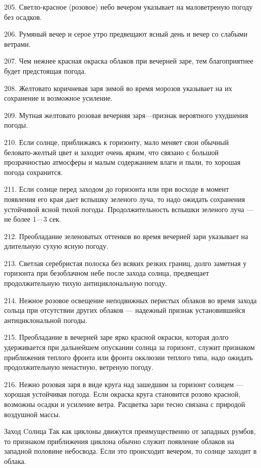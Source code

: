 205. Светло-красное (розовое) небо вечером указывает на маловетреную погоду без осадков.

206. Румяный вечер и серое утро предвещают ясный день и вечер со слабыми ветрами.

207. Чем нежнее красная окраска облаков при вечерней заре, тем благоприятнее будет предстоящая погода.

208. Желтовато коричневая заря зимой во время морозов указывает на их сохранение и возможное усиление.

209. Мутная желтовато розовая вечерняя заря—признак вероятного ухудшения погоды.

210. Если солнце, приближаясь к горизонту, мало меняет свои обычный беловато-желтый цвет и заходит очень ярким, что связано с большой прозрачностью атмосферы и малым содержанием влаги и пыли, то хорошая погода сохранится.

211. Если солнце перед заходом до горизонта или при восходе в момент появления его края дает вспышку зеленого луча, то надо ожидать сохранения устойчивой ясной тихой погоды. Продолжительность вспышки зеленого луча — не более 1—3 сек.

212. Преобладание зеленоватых оттенков во время вечерней зари указывает на длительную сухую ясную погоду.

213. Светлая серебристая полоска без всяких резких границ, долго заметная у горизонта при безоблачном небе после захода солнца, предвещает продолжительную тихую антициклональную погоду.

214. Нежное розовое освещение неподвижных перистых облаков во время захода сольца при отсутствии других облаков — надежный признак установившейся антициклональной погоды.

215. Преобладание в вечерней заре ярко красной окраски, которая долго удерживается при дальнейшем опускании солнца за горизонт, служит признаком приближения теплого фронта или фронта окклюзии теплого типа, надо ожидать продолжительную ненастную, ветреную погоду.

216. Нежно розовая заря в виде круга над зашедшим за горизонт солнцем — хорошая устойчивая погода. Если окраска круга становится розово красной, возможны осадки и усиление ветра. Расцветка зари тесно связана с природой воздушной массы.

Заход Cолнца
Так как циклоны движутся преимущественно от западных румбов, то признаком приближения циклона обычно служит появление облаков на западной половине небосвода. Если это происходит вечером, то солнце заходит в облака.

